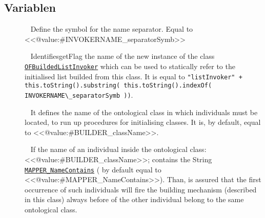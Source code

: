 \subsection{Variablen}
\begin{description}
\item[{\label{ontologyFramework.OFRunning.OFInitialising.OFInitialiser.INVOKERNAME\_separatorSymb}}]
~ Define the symbol for the name separator. Equal to <<@value:#INVOKERNAME\_separatorSymb>>
\item[{\label{ontologyFramework.OFRunning.OFInitialising.OFInitialiser.INVOKER\_InstanceName}}]
~ IdentifiesgetFlag the name of the new instance of the class \texttt{\hyperlink{ontologyFramework.OFRunning.OFInvokingManager.OFBuildedListInvoker-class}{OFBuildedListInvoker}} which can
 be used to statically refer to the initialised list builded from this class. It
 is equal to \verb!"listInvoker" + this.toString().substring( this.toString().indexOf( INVOKERNAME\_separatorSymb ))!.
\item[{\label{ontologyFramework.OFRunning.OFInitialising.OFInitialiser.BUILDER\_className}}]
~ It defines the name of the ontological class in which  
 individuals must be located, to run up procedures for initialising classes. 
 It is, by default, equal to <<@value:#BUILDER\_className>>.
\item[{\label{ontologyFramework.OFRunning.OFInitialising.OFInitialiser.MAPPER\_NameContains}}]
~ If the name of an individual inside the ontological class: <<@value:#BUILDER\_className>>;
 contains the String \texttt{\hyperlink{ontologyFramework.OFRunning.OFInitialising.OFInitialiser.MAPPER\_NameContains}{MAPPER\_NameContains}} ( by default equal to <<@value:#MAPPER\_NameContains>>).
 Than, is assured that the first occurrence of such individuals will fire the
 building mechanism (described in this class) always before of the other
 individual belong to the same ontological class.
\item[{\label{ontologyFramework.OFRunning.OFInitialising.OFInitialiser.PROCEDURE\_NameContains}}]

\end{description}
